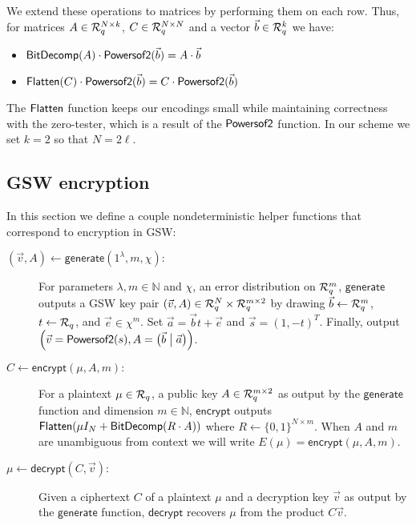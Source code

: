 We extend these operations to matrices by performing them on each row.  Thus, for matrices $A \in \mathcal{R}_q^{N \times k}$, $C \in \mathcal{R}_q^{N \times N}$ and a vector $\vec{b} \in \mathcal{R}_q^k$ we have:

\begin{itemize}
\item $\mathsf{BitDecomp}(A)\cdot\mathsf{Powersof2}(\vec{b}) = A\cdot\vec{b}$
\item $\mathsf{Flatten}(C)\cdot\mathsf{Powersof2}(\vec{b}) = C\cdot\mathsf{Powersof2}(\vec{b})$
\end{itemize}

The $\mathsf{Flatten}$ function keeps our encodings small while maintaining correctness with the zero-tester, which is a result of the $\mathsf{Powersof2}$ function.  In our scheme we set $k = 2$ so that $N = 2\ell$.

\subsection{GSW encryption}

In this section we define a couple nondeterministic helper functions that correspond to encryption in GSW: 

\begin{description}

\item[$(\vec{v}, A) \leftarrow \mathsf{generate}(1^\lambda, m, \chi):$] For parameters $\lambda, m \in \mathbb{N}$ and $\chi$, an error distribution on $\mathcal{R}_q^m$, $\mathsf{generate}$ outputs a GSW key pair $(\vec{v},A) \in \mathcal{R}_q^N \times \mathcal{R}_q^{m \times 2}$ by drawing $\vec{b} \leftarrow \mathcal{R}_q^m$, $t \leftarrow \mathcal{R}_q$, and $\vec{e}\in \chi^m$.  Set $\vec{a} = \vec{b}t + \vec{e}$ and $\vec{s} = (1, -t)^T$.  Finally, output $\left(\vec{v} = \mathsf{Powersof2}(s), A = \big(\vec{b} \; \big| \; \vec{a}\big)\right)$.  

\item[$C \leftarrow \mathsf{encrypt}(\mu, A,m):$]  For a plaintext $\mu \in \mathcal{R}_q$, a public key $A \in \mathcal{R}_q^{m \times 2}$ as output by the $\mathsf{generate}$ function and dimension $m \in \mathbb{N}$, $\mathsf{encrypt}$ outputs $\mathsf{Flatten}(\mu I_N + \mathsf{BitDecomp}(R\cdot A))$ where $R \leftarrow \{0,1\}^{N\times m}$.  When $A$ and $m$ are unambiguous from context we will write $E(\mu) = \mathsf{encrypt}(\mu, A, m)$.

\item[$\mu \leftarrow \mathsf{decrypt}(C, \vec{v}):$]  Given a ciphertext $C$ of a plaintext $\mu$ and a decryption key $\vec{v}$ as output by the $\mathsf{generate}$ function, $\mathsf{decrypt}$ recovers $\mu$ from the product $C\vec{v}$.  
\end{description}

